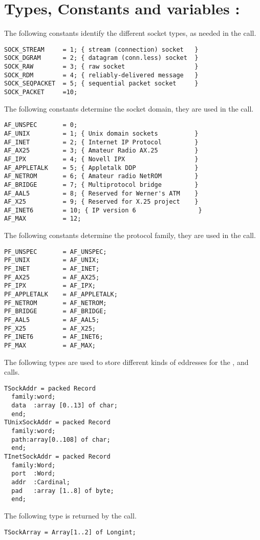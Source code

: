 \section {Types, Constants and variables : }
The following constants identify the different socket types, as needed in
the  call.
\begin{verbatim}
SOCK_STREAM     = 1; { stream (connection) socket   }
SOCK_DGRAM      = 2; { datagram (conn.less) socket  }
SOCK_RAW        = 3; { raw socket                   }
SOCK_RDM        = 4; { reliably-delivered message   }
SOCK_SEQPACKET  = 5; { sequential packet socket     }
SOCK_PACKET     =10;
\end{verbatim}
The following constants determine the socket domain, they are used in the
 call.
\begin{verbatim}
AF_UNSPEC       = 0;
AF_UNIX         = 1; { Unix domain sockets          }
AF_INET         = 2; { Internet IP Protocol         }
AF_AX25         = 3; { Amateur Radio AX.25          }
AF_IPX          = 4; { Novell IPX                   }
AF_APPLETALK    = 5; { Appletalk DDP                }
AF_NETROM       = 6; { Amateur radio NetROM         }
AF_BRIDGE       = 7; { Multiprotocol bridge         }
AF_AAL5         = 8; { Reserved for Werner's ATM    }
AF_X25          = 9; { Reserved for X.25 project    }
AF_INET6        = 10; { IP version 6                 }
AF_MAX          = 12;
\end{verbatim}
The following constants determine the protocol family, they are used in the
 call.
\begin{verbatim} 
PF_UNSPEC       = AF_UNSPEC;
PF_UNIX         = AF_UNIX;
PF_INET         = AF_INET;
PF_AX25         = AF_AX25;
PF_IPX          = AF_IPX;
PF_APPLETALK    = AF_APPLETALK;
PF_NETROM       = AF_NETROM;
PF_BRIDGE       = AF_BRIDGE;
PF_AAL5         = AF_AAL5;
PF_X25          = AF_X25;
PF_INET6        = AF_INET6;
PF_MAX          = AF_MAX;   
\end{verbatim}
The following types are used to store different kinds of eddresses for the
,  and  calls.
\begin{verbatim}  
TSockAddr = packed Record
  family:word;
  data  :array [0..13] of char;
  end;
TUnixSockAddr = packed Record
  family:word;
  path:array[0..108] of char;
  end;
TInetSockAddr = packed Record
  family:Word;
  port  :Word;
  addr  :Cardinal;
  pad   :array [1..8] of byte; 
  end;
\end{verbatim}
The following type is returned by the  call.
\begin{verbatim}
TSockArray = Array[1..2] of Longint;
\end{verbatim}

